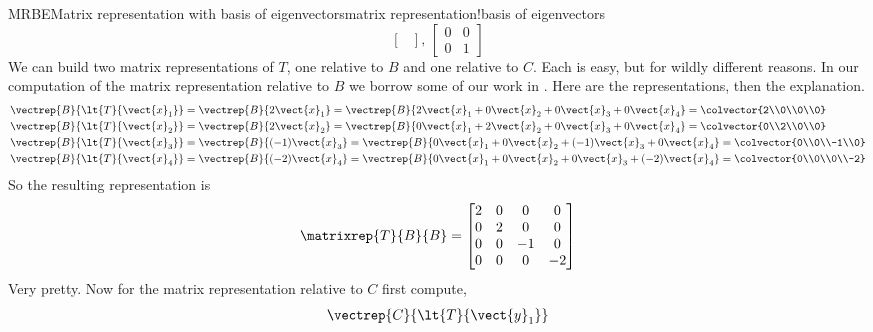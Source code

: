 \begin{example}{MRBE}{Matrix representation with basis of eigenvectors}{matrix representation!basis of eigenvectors}
\begin{equation*}
{\begin{bmatrix}
\end{bmatrix}
,\,
\begin{bmatrix}
 0 & 0 \\ 0 & 1
\end{bmatrix}
}
\end{equation*}
%
We can build two matrix representations of $T$, one relative to $B$ and one relative to $C$.  Each is easy, but for wildly different reasons.  In our computation of the matrix representation relative to $B$ we borrow some of our work in .  Here are the representations, then the explanation.
%
\begin{align*}
\vectrep{B}{\lt{T}{\vect{x}_1}}
&=
\vectrep{B}{2\vect{x}_1}
=\vectrep{B}{2\vect{x}_1+0\vect{x}_2+0\vect{x}_3+0\vect{x}_4}
=\colvector{2\\0\\0\\0}\\
%
\vectrep{B}{\lt{T}{\vect{x}_2}}
&=
\vectrep{B}{2\vect{x}_2}
=\vectrep{B}{0\vect{x}_1+2\vect{x}_2+0\vect{x}_3+0\vect{x}_4}
=\colvector{0\\2\\0\\0}\\
%
\vectrep{B}{\lt{T}{\vect{x}_3}}
&=
\vectrep{B}{(-1)\vect{x}_3}
=\vectrep{B}{0\vect{x}_1+0\vect{x}_2+(-1)\vect{x}_3+0\vect{x}_4}
=\colvector{0\\0\\-1\\0}\\
%
\vectrep{B}{\lt{T}{\vect{x}_4}}
&=
\vectrep{B}{(-2)\vect{x}_4}
=\vectrep{B}{0\vect{x}_1+0\vect{x}_2+0\vect{x}_3+(-2)\vect{x}_4}
=\colvector{0\\0\\0\\-2}
%
\end{align*}
%
So the resulting representation is
%
\begin{align*}
\matrixrep{T}{B}{B}
=
\begin{bmatrix}
2 & 0 & 0 & 0\\
0 & 2 & 0 & 0\\
0 & 0 & -1 & 0\\
0 & 0 & 0 & -2\\
\end{bmatrix}
\end{align*}
%
Very pretty.
%
Now for the matrix representation relative to $C$ first compute,
%
\begin{align*}
\vectrep{C}{\lt{T}{\vect{y}_1}}

\end{align*}
\end{example}
